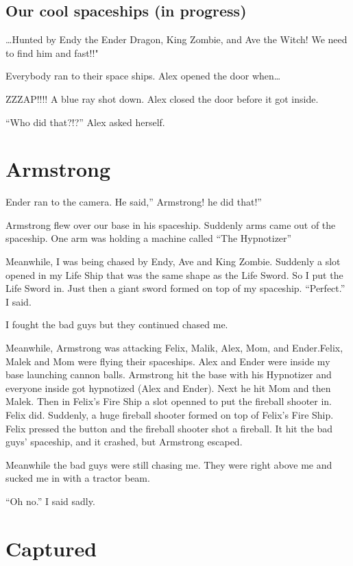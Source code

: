 \documentclass[12pt,twoside]{krantz}
\begin{document}
\hypertarget{our-cool-spaceships-in-progress}{%
\subsection{Our cool spaceships (in
progress)}\label{our-cool-spaceships-in-progress}}

\ldots{}Hunted by Endy the Ender Dragon, King Zombie, and Ave the Witch!
We need to find him and fast!!"

Everybody ran to their space ships. Alex opened the door when\ldots{}

ZZZAP!!!! A blue ray shot down. Alex closed the door before it got
inside.

``Who did that?!?'' Alex asked herself.

\hypertarget{armstrong}{%
\section{Armstrong}\label{armstrong}}

Ender ran to the camera. He said,'' Armstrong! he did that!''

Armstrong flew over our base in his spaceship. Suddenly arms came out of
the spaceship. One arm was holding a machine called ``The Hypnotizer''

Meanwhile, I was being chased by Endy, Ave and King Zombie. Suddenly a
slot opened in my Life Ship that was the same shape as the Life Sword.
So I put the Life Sword in. Just then a giant sword formed on top of my
spaceship. ``Perfect.'' I said.

I fought the bad guys but they continued chased me.

Meanwhile, Armstrong was attacking Felix, Malik, Alex, Mom, and
Ender.Felix, Malek and Mom were flying their spaceships. Alex and Ender
were inside my base launching cannon balls. Armstrong hit the base with
his Hypnotizer and everyone inside got hypnotized (Alex and Ender). Next
he hit Mom and then Malek. Then in Felix's Fire Ship a slot openned to
put the fireball shooter in. Felix did. Suddenly, a huge fireball
shooter formed on top of Felix's Fire Ship. Felix pressed the button and
the fireball shooter shot a fireball. It hit the bad guys' spaceship,
and it crashed, but Armstrong escaped.

Meanwhile the bad guys were still chasing me. They were right above me
and sucked me in with a tractor beam.

``Oh no.'' I said sadly.

\hypertarget{captured}{%
\section{Captured}\label{captured}}
\end{document}
